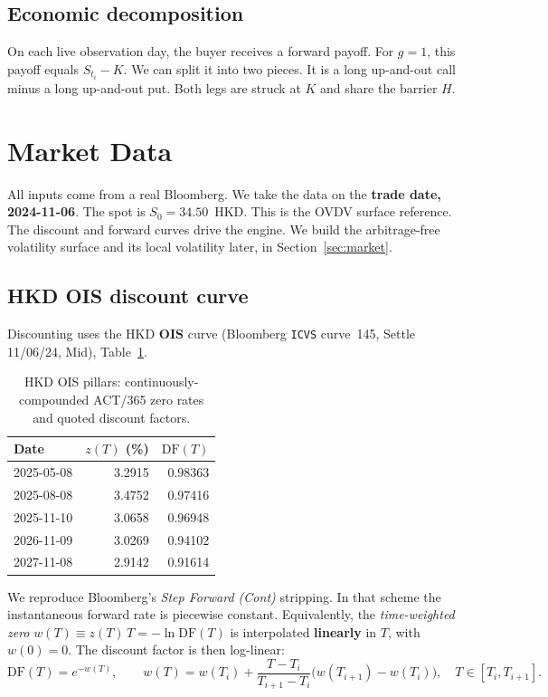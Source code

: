 \documentclass[11pt]{article}
\newcommand{\DF}{\mathrm{DF}}
\begin{document}
\subsection{Economic decomposition}
On each live observation day, the buyer receives a forward payoff. For $g=1$,
this payoff equals $S_{t_i}-K$. We can split it into two pieces. It is a long
up-and-out call minus a long up-and-out put. Both legs are struck at $K$ and
share the barrier $H$.

\section{Market Data}\label{sec:data}
All inputs come from a real Bloomberg. We take the data on the \textbf{trade date,
2024-11-06}. The spot is $S_0=34.50$~HKD. This is the OVDV surface reference. The discount and forward curves drive the engine. We build the arbitrage-free
volatility surface and its local volatility later, in Section~\ref{sec:market}.

\subsection{HKD OIS discount curve}
Discounting uses the HKD \textbf{OIS} curve (Bloomberg \texttt{ICVS} curve~145, Settle
11/06/24, Mid), Table~\ref{tab:ois}.

\begin{table}[h]\centering\small
\begin{tabular}{@{}lrr@{}}
\toprule
Date & $z(T)$ (\%) & $\DF(T)$ \\
\midrule
2025-05-08 & 3.2915 & 0.98363 \\
2025-08-08 & 3.4752 & 0.97416 \\
2025-11-10 & 3.0658 & 0.96948 \\
2026-11-09 & 3.0269 & 0.94102 \\
2027-11-08 & 2.9142 & 0.91614 \\
\bottomrule
\end{tabular}
\caption{HKD OIS pillars: continuously-compounded ACT/365 zero rates and quoted discount factors.}
\label{tab:ois}
\end{table}

We reproduce Bloomberg's \emph{Step Forward (Cont)} stripping. In that scheme the instantaneous
forward rate is piecewise constant. Equivalently, the \emph{time-weighted zero}
$w(T)\equiv z(T)\,T=-\ln\DF(T)$ is interpolated \textbf{linearly} in $T$, with $w(0)=0$. The
discount factor is then log-linear:
\begin{equation}
  \DF(T)=e^{-w(T)},\qquad
  w(T)=w(T_i)+\frac{T-T_i}{T_{i+1}-T_i}\bigl(w(T_{i+1})-w(T_i)\bigr),\quad T\in[T_i,T_{i+1}].
  \label{eq:dfinterp}
\end{equation}
\end{document}
